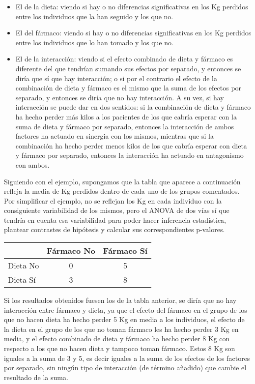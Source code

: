 \begin{itemize}
\item El de la dieta: viendo si hay o no diferencias significativas en los Kg perdidos entre los individuos que la han
seguido y los que no.
\item El del fármaco: viendo si hay o no diferencias significativas en los Kg perdidos entre los individuos que lo han
tomado y los que no.
\item El de la interacción: viendo si el efecto combinado de dieta y fármaco es diferente del que tendrían sumando sus
efectos por separado, y entonces se diría que sí que hay interacción; o si por el contrario el efecto de la combinación
de dieta y fármaco es el mismo que la suma de los efectos por separado, y entonces se diría que no hay interacción. A su
vez, si hay interacción se puede dar en dos sentidos: si la combinación de dieta y fármaco ha hecho perder más kilos a
los pacientes de los que cabría esperar con la suma de dieta y fármaco por separado, entonces la interacción de ambos
factores ha actuado en sinergia con los mismos, mientras que si la combinación ha hecho perder menos kilos de los que
cabría esperar con dieta y fármaco por separado, entonces la interacción ha actuado en antagonismo con ambos.
\end{itemize}

Siguiendo con el ejemplo, supongamos que la tabla que aparece a continuación refleja la media de Kg perdidos dentro de
cada uno de los grupos comentados. Por simplificar el ejemplo, no se reflejan los Kg en cada individuo con la
consiguiente variabilidad de los mismos, pero el ANOVA de dos vías sí que tendría en cuenta esa variabilidad para poder
hacer inferencia estadística, plantear contrastes de hipótesis y calcular sus correspondientes p-valores.

\begin{center}
\begin{tabular}{|l|c|c|}
\cline{2-3}
\multicolumn{1}{c|}{} & Fármaco No & Fármaco Sí \\
\hline
Dieta No & 0 & 5 \\
\hline
Dieta Sí & 3 & 8 \\
\hline
\end{tabular}
\end{center}

Si los resultados obtenidos fuesen los de la tabla anterior, se diría que no hay interacción entre fármaco y dieta, ya
que el efecto del fármaco en el grupo de los que no hacen dieta ha hecho perder 5 Kg en media a los individuos, el
efecto de la dieta en el grupo de los que no toman fármaco les ha hecho perder 3 Kg en media, y el efecto combinado de
dieta y fármaco ha hecho perder 8 Kg con respecto a los que no hacen dieta y tampoco toman fármaco. Estos 8 Kg son
iguales a la suma de 3 y 5, es decir iguales a la suma de los efectos de los factores por separado, sin ningún tipo de
interacción (de término añadido) que cambie el resultado de la suma.


